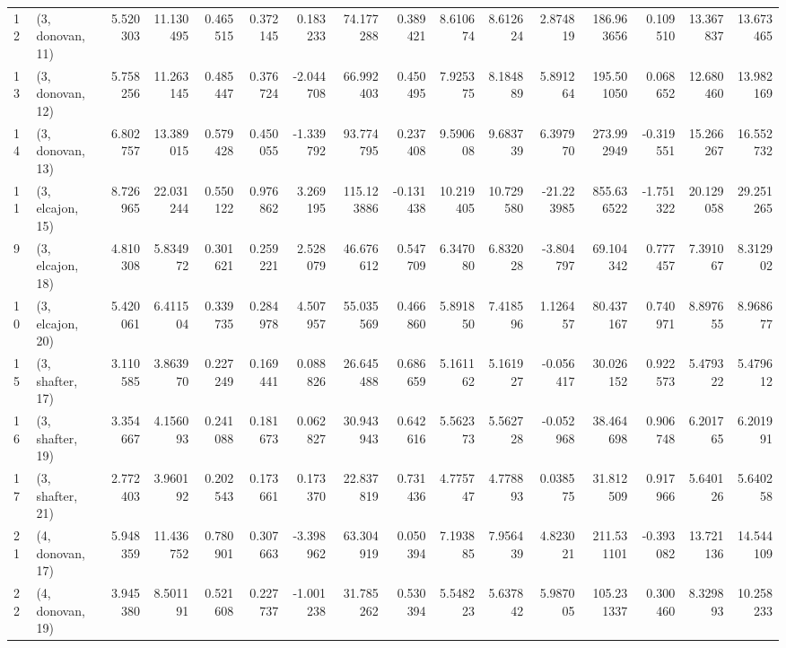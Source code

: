\begin{tabular}{llrrrrrrrrrrrrrr}
12 &  (3, donovan, 11) &   5.520303 &  11.130495 &   0.465515 &  0.372145 &   0.183233 &   74.177288 &  0.389421 &   8.610674 &   8.612624 &   2.874819 &   186.963656 &  0.109510 &  13.367837 &  13.673465 \\
13 &  (3, donovan, 12) &   5.758256 &  11.263145 &   0.485447 &  0.376724 &  -2.044708 &   66.992403 &  0.450495 &   7.925375 &   8.184889 &   5.891264 &   195.501050 &  0.068652 &  12.680460 &  13.982169 \\
14 &  (3, donovan, 13) &   6.802757 &  13.389015 &   0.579428 &  0.450055 &  -1.339792 &   93.774795 &  0.237408 &   9.590608 &   9.683739 &   6.397970 &   273.992949 & -0.319551 &  15.266267 &  16.552732 \\
11 &  (3, elcajon, 15) &   8.726965 &  22.031244 &   0.550122 &  0.976862 &   3.269195 &  115.123886 & -0.131438 &  10.219405 &  10.729580 & -21.223985 &   855.636522 & -1.751322 &  20.129058 &  29.251265 \\
9  &  (3, elcajon, 18) &   4.810308 &   5.834972 &   0.301621 &  0.259221 &   2.528079 &   46.676612 &  0.547709 &   6.347080 &   6.832028 &  -3.804797 &    69.104342 &  0.777457 &   7.391067 &   8.312902 \\
10 &  (3, elcajon, 20) &   5.420061 &   6.411504 &   0.339735 &  0.284978 &   4.507957 &   55.035569 &  0.466860 &   5.891850 &   7.418596 &   1.126457 &    80.437167 &  0.740971 &   8.897655 &   8.968677 \\
15 &  (3, shafter, 17) &   3.110585 &   3.863970 &   0.227249 &  0.169441 &   0.088826 &   26.645488 &  0.686659 &   5.161162 &   5.161927 &  -0.056417 &    30.026152 &  0.922573 &   5.479322 &   5.479612 \\
16 &  (3, shafter, 19) &   3.354667 &   4.156093 &   0.241088 &  0.181673 &   0.062827 &   30.943943 &  0.642616 &   5.562373 &   5.562728 &  -0.052968 &    38.464698 &  0.906748 &   6.201765 &   6.201991 \\
17 &  (3, shafter, 21) &   2.772403 &   3.960192 &   0.202543 &  0.173661 &   0.173370 &   22.837819 &  0.731436 &   4.775747 &   4.778893 &   0.038575 &    31.812509 &  0.917966 &   5.640126 &   5.640258 \\
21 &  (4, donovan, 17) &   5.948359 &  11.436752 &   0.780901 &  0.307663 &  -3.398962 &   63.304919 &  0.050394 &   7.193885 &   7.956439 &   4.823021 &   211.531101 & -0.393082 &  13.721136 &  14.544109 \\
22 &  (4, donovan, 19) &   3.945380 &   8.501191 &   0.521608 &  0.227737 &  -1.001238 &   31.785262 &  0.530394 &   5.548223 &   5.637842 &   5.987005 &   105.231337 &  0.300460 &   8.329893 &  10.258233 \\

\end{tabular}
